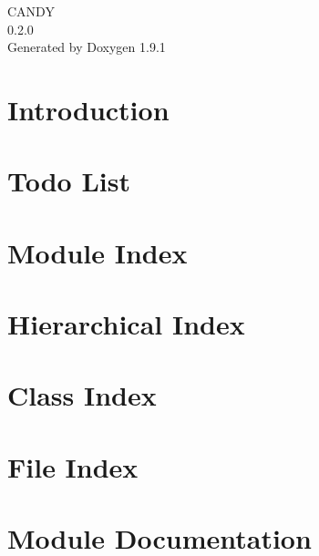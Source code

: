 \let\mypdfximage\pdfximage\def\pdfximage{\immediate\mypdfximage}\documentclass[twoside]{book}
\newcommand{\+}{\discretionary{\mbox{\scriptsize$\hookleftarrow$}}{}{}}
\newcommand{\clearemptydoublepage}{%
  \newpage{\pagestyle{empty}\cleardoublepage}%
}
\begin{document}
\raggedbottom

\hypersetup{pageanchor=false,
             bookmarksnumbered=true,
             pdfencoding=unicode
            }
\begin{titlepage}
\vspace*{7cm}
\begin{center}%
{\Large CANDY \\[1ex]\large 0.\+2.\+0 }\\
\vspace*{1cm}
{\large Generated by Doxygen 1.9.1}\\
\end{center}
\end{titlepage}
\clearemptydoublepage
{}
\tableofcontents
\clearemptydoublepage
{}
\hypersetup{pageanchor=true}

\chapter{Introduction}
\label{index}\hypertarget{index}{}
\chapter{Todo List}
\label{todo}

\chapter{Module Index}

\chapter{Hierarchical Index}

\chapter{Class Index}

\chapter{File Index}

\chapter{Module Documentation}















\end{document}
